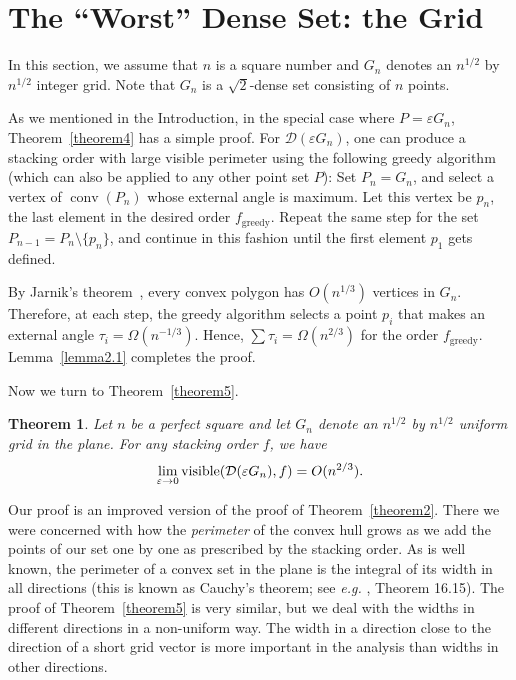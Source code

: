 \documentclass[11pt]{article}
\newtheorem{thm}{Theorem}             \newtheorem{lem}[thm]{Lemma}
\DeclareMathOperator{\vis}{\mathrm{visible}}
\DeclareMathOperator{\conv}{\mathrm{conv}}
\newcommand{\eps}{\varepsilon}
\begin{document}
\section{The ``Worst'' Dense Set: the Grid}

In this section, we assume that $n$ is a square number and $G_n$ denotes an $n^{1/2}$ by $n^{1/2}$ integer grid. Note that $G_n$ is a $\sqrt2$-dense set consisting of $n$ points.

As we mentioned in the Introduction, in the special case where $P=\eps G_n$, Theorem~\ref{theorem4} has a simple proof. For $\mathcal D(\eps G_n)$, one can produce a stacking order with large visible perimeter using the following greedy algorithm (which can also be applied to any other point set $P$): Set $P_n=G_n$, and select a vertex of $\conv(P_n)$ whose external angle is maximum. Let this vertex be $p_n$, the last element in the desired order $f_{\text{greedy}}$. Repeat the same step for the set $P_{n-1} = P_n \setminus \{p_n\}$, and continue in this fashion until the first element $p_1$ gets defined.

By Jarnik's theorem~\cite{Ja25}, every convex polygon has $O(n^{1/3})$ vertices in $G_n$. Therefore, at each step, the greedy algorithm selects a point $p_i$ that makes an external angle $\tau_i = \Omega(n^{-1/3})$. Hence, $\sum\tau_i = \Omega(n^{2/3})$ for the order $f_{\text{greedy}}$. Lemma~\ref{lemma2.1} completes the proof.

Now we turn to Theorem~\ref{theorem5}.

{
\renewcommand{\thethm}{5}
\begin{thm}
Let $n$ be a perfect square and let $G_n$ denote an $n^{1/2}$ by $n^{1/2}$ uniform grid in the plane. For any stacking order $f$, we have
$$\lim_{\eps\rightarrow 0}\vis({\cal D}(\eps G_n),f)=O(n^{2/3}).$$
\end{thm}
\addtocounter{thm}{-1}
}

Our proof is an improved version of the
proof of Theorem~\ref{theorem2}. There we were concerned with how the {\em perimeter} of the
convex hull grows as we add the points of our set one by one as prescribed by
the stacking order. As is well known, the perimeter of a convex set in the plane is the
integral of its width in all directions (this is known as Cauchy's theorem; see {\it e.g.} \cite{PaA95}, Theorem 16.15).
The proof of Theorem~\ref{theorem5} is very
similar, but we deal with the widths in different directions
in a non-uniform way. The width in a direction close to the
direction of a short grid vector is more important in the analysis than
widths in other directions.
\end{document}
